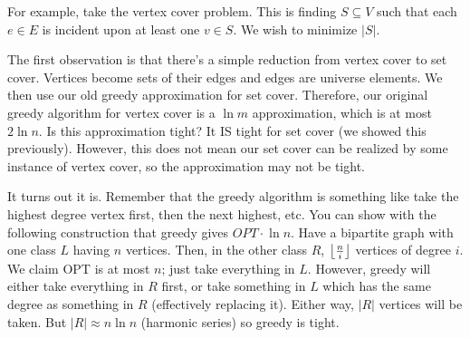 \begin{example}
    For example, take the vertex cover problem. This is finding $S \subseteq V$ such that each $e \in E$ is incident upon at least one $v \in S$. We wish to minimize $|S|$.

    The first observation is that there's a simple reduction from vertex cover to set cover. Vertices become sets of their edges and edges are universe elements.
    We then use our old greedy approximation for set cover.
    Therefore, our original greedy algorithm for vertex cover is a $\ln m$ approximation, which is at most $2 \ln n$. Is this approximation tight?
    It IS tight for set cover (we showed this previously). However, this does not mean our set cover can be realized by some instance of vertex cover, so the approximation may not be tight.

    It turns out it is. Remember that the greedy algorithm is something like take the highest degree vertex first, then the next highest, etc.
    You can show with the following construction that greedy gives $OPT \cdot \ln n$. Have a bipartite graph with one class $L$ having $n$ vertices.
    Then, in the other class $R$, $\left\lfloor \frac{n}{i} \right\rfloor$ vertices of degree $i$. We claim OPT is at most $n$; just take everything in $L$. However,
    greedy will either take everything in $R$ first, or take something in $L$ which has the same degree as something in $R$ (effectively replacing it). Either way, $|R|$ vertices will be taken.
    But $|R| \approx n \ln n$ (harmonic series) so greedy is tight.
\end{example}

